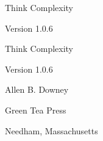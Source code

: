 \documentclass[10pt]{book}
\newcommand{\thetitle}{Think Complexity}
\newcommand{\theversion}{1.0.6}
\begin{document}
\begin{latexonly}

\renewcommand{\blankpage}{\thispagestyle{empty} \quad \newpage}



\thispagestyle{empty}

\begin{flushright}
\vspace*{2.0in}

\begin{spacing}{3}
{\huge \thetitle}
\end{spacing}

\vspace{0.25in}

Version \theversion

\vfill

\end{flushright}


\blankpage
\blankpage

\pagebreak
\thispagestyle{empty}

\begin{flushright}
\vspace*{2.0in}

\begin{spacing}{3}
{\huge \thetitle}
\end{spacing}

\vspace{0.25in}

Version \theversion

\vspace{1in}


{\Large
Allen B. Downey\\
}


\vspace{0.5in}

{\Large Green Tea Press}

{\small Needham, Massachusetts}

\vfill

\end{flushright}



\end{latexonly}
\end{document}
